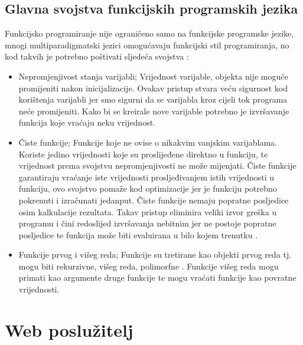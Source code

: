 \documentclass[]{foi}
\begin{document}
\section{Glavna svojstva funkcijskih programskih jezika} \label{sec:svojstva}

Funkcijsko programiranje nije ograničeno samo na funkcijske programske jezike,
mnogi multiparadigmatski jezici omogućavaju funkcijski stil programiranja, no kod takvih je
potrebno poštivati sljedeća svojstva \cite{rovzic2016lambda}:
\begin{itemize}
	\item Nepromjenjivost stanja varijabli; Vrijednost varijable, objekta nije moguće promijeniti
	      nakon inicijalizacije. Ovakav pristup stvara veću sigurnost kod korištenja varijabli jer
	      smo sigurni da se varijabla kroz cijeli tok programa neće promijeniti. Kako bi se kreirale
	      nove varijable potrebno je izvršavanje funkcija koje vraćaju neku vrijednost.
	\item Čiste funkcije; Funkcije koje ne ovise o nikakvim vanjskim varijablama. Koriste jedino vrijednosti
	      koje su proslijeđene direktno u funkciju, te vrijednost prema svojstvu nepromjenjivosti ne može mijenjati.
	      Čiste funkcije garantiraju vraćanje iste vrijednosti prosljeđivanjem istih vrijednosti u funkciju,
	      ovo svojstvo pomaže kod optimizacije jer je funkciju potrebno pokrenuti i izračunati jedanput.
	      Čiste funkcije nemaju popratne posljedice osim kalkulacije rezultata. Takav pristup eliminira
	      veliki izvor greška u programu i čini redoslijed izvršavanja nebitnim jer ne postoje popratne
	      posljedice te funkcija može biti evaluirana u bilo kojem trenutku \cite{hughes1989functional}.
	\item Funkcije prvog i višeg reda; Funkcije su tretirane kao objekti prvog reda tj. mogu biti rekurzivne,
	      višeg reda, polimorfne \cite{10.1145/72551.72554}. Funkcije višeg reda mogu primati kao argumente
	      druge funkcije te mogu vraćati funkcije kao povratne vrijednosti.
\end{itemize}

\chapter{Web poslužitelj}
\end{document}
